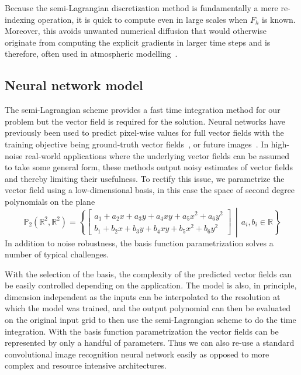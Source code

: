 \documentclass[a4paper,12pt]{article}
\begin{document}
Because the semi-Lagrangian discretization method is fundamentally a mere re-indexing operation, it is quick to compute even in large scales when $F_h$ is known.
Moreover, this avoids unwanted numerical diffusion that would otherwise originate from computing the explicit gradients in larger time steps and is therefore, often used in atmospheric modelling~\cite{diamantakis}.

\subsection{Neural network model}
The semi-Lagrangian scheme provides a fast time integration method for our problem but the vector field is required for the solution.
Neural networks have previously been used to predict pixel-wise values for full vector fields with the training objective being ground-truth vector fields~\cite{ofnn}, or future images~\cite{debezenac}.
In high-noise real-world applications where the underlying vector fields can be assumed to take some general form, these methods output noisy estimates of vector fields and thereby limiting their usefulness.
To rectify this issue, we parametrize the vector field using a low-dimensional basis, in this case the space of second degree polynomials on the plane
\begin{equation}
    \mathbb{P}_2(\mathbb{R}^2, \mathbb{R}^2) =
    \left\{
        \begin{bmatrix}
            a_1 + a_2x + a_3y + a_4xy + a_5x^2 + a_6y^2\\
            b_1 + b_2x + b_3y + b_4xy + b_5x^2 + b_6y^2
        \end{bmatrix} \,
    \middle| \,
        a_i, b_i \in \mathbb{R}
    \right\}
\end{equation}
In addition to noise robustness, the basis function parametrization solves a number of typical challenges.

With the selection of the basis, the complexity of the predicted vector fields can be easily controlled depending on the application.
The model is also, in principle, dimension independent as the inputs can be interpolated to the resolution at which the model was trained, and the output polynomial can then be evaluated on the original input grid to then use the semi-Lagrangian scheme to do the time integration.
With the basis function parametrization the vector fields can be represented by only a handful of parameters.
Thus we can also re-use a standard convolutional image recognition neural network easily as opposed to more complex and resource intensive architectures.
\end{document}

